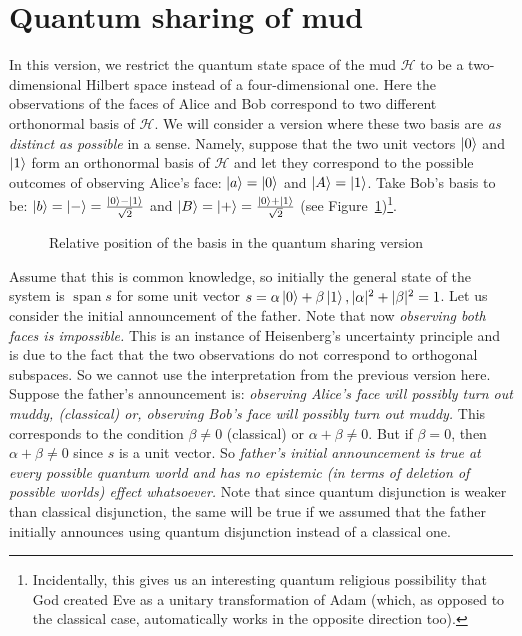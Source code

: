 \documentclass[a4paper]{article}
\newcommand{\HH}{\mathcal{H}}
\DeclareMathOperator{\spn}{span}
\begin{document}
\section*{Quantum sharing of mud}
In this version, we restrict the quantum state space of the mud $\HH$ to be a
two-dimensional Hilbert space instead of a four-dimensional one. Here the
observations of the faces of Alice and Bob correspond to two different
orthonormal basis of $\HH$. We will consider a version where these two basis are
\emph{as distinct as possible} in a sense. Namely, suppose that the two unit
vectors $\ket{0}$ and $\ket{1}$ form an orthonormal basis of $\HH$ and let they
correspond to the possible outcomes of observing Alice's face: $\ket{a} =
\ket{0}$ and $\ket{A} = \ket{1}$. Take Bob's basis to be: $\ket{b} = \ket{-} =
\frac{\ket{0} - \ket{1}}{\sqrt{2}}$ and $\ket{B} = \ket{+} = \frac{\ket{0} +
\ket{1}}{\sqrt{2}}$ (see Figure~\ref{fig:shab})\footnote{Incidentally, this
gives us an interesting quantum religious possibility that God created Eve as a
unitary transformation of Adam (which, as opposed to the classical case,
automatically works in the opposite direction too).}.
\begin{figure}
    \centering
{}
    \caption{Relative position of the basis in the quantum sharing version}
    \label{fig:shab}
\end{figure}
Assume that this is common knowledge, so initially the general state of the
system is $\spn s$ for some unit vector $s = \alpha \ket{0} + \beta \ket{1},
|\alpha|^2 + |\beta|^2 = 1$.  Let us consider the initial announcement of the
father. Note that now \emph{observing both faces is impossible.} This is an
instance of Heisenberg's uncertainty principle and is due to the fact that the
two observations do not correspond to orthogonal subspaces. So we cannot use the
interpretation from the previous version here.  Suppose the father's
announcement is: \emph{observing Alice's face will possibly turn out muddy,
(classical) or, observing Bob's face will possibly turn out muddy.} This
corresponds to the condition $\beta \neq 0$ (classical) or $\alpha + \beta \neq
0$. But if $\beta = 0$, then $\alpha + \beta \neq 0$ since $s$ is a unit vector.
So \emph{father's initial announcement is true at every possible quantum world
    and has no epistemic (in terms of deletion of possible worlds) effect
whatsoever.} Note that since quantum disjunction is weaker than classical
disjunction, the same will be true if we assumed that the father initially
announces using quantum disjunction instead of a classical one.
\end{document}
